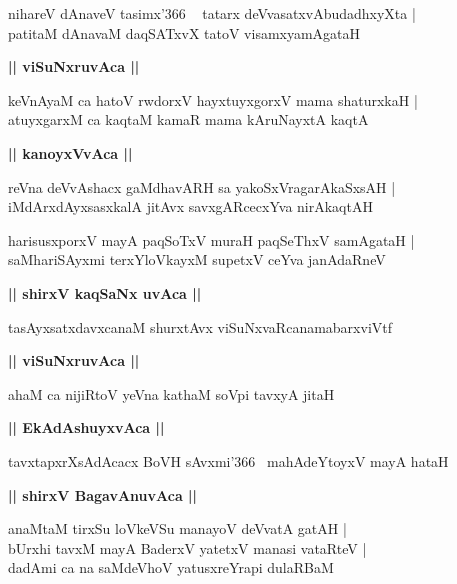 \documentclass[twoside,12pt,openright]{book}
\newcounter{shloka}[chapter]
\def\uvaca#1{\centerline{{\large\textbf{#1}}}}
\begin{document}
\begin{shloka}%
nihareV dAnaveV tasimx\char'366 ~ tatarx deVvasatxvAbudadhxyXta |\\
patitaM dAnavaM daqSATxvX tatoV visamxyamAgataH
\end{shloka}

\uvaca{|| viSuNxruvAca ||}

\begin{shloka}%
keVnAyaM ca hatoV rwdorxV hayxtuyxgorxV mama shaturxkaH |\\
atuyxgarxM ca kaqtaM kamaR mama kAruNayxtA kaqtA
\end{shloka}

\uvaca{|| kanoyxVvAca ||}

\begin{shloka}%
reVna deVvAshacx gaMdhavARH sa yakoSxVragarAkaSxsAH |\\
iMdArxdAyxsasxkalA jitAvx savxgARcecxYva nirAkaqtAH 
\end{shloka}

\begin{shloka}%
harisusxporxV mayA paqSoTxV muraH paqSeThxV samAgataH |\\
saMhariSAyxmi terxYloVkayxM supetxV ceYva janAdaRneV 
\end{shloka}

\uvaca{|| shirxV kaqSaNx uvAca ||}

\begin{shloka}%
tasAyxsatxdavxcanaM shurxtAvx viSuNxvaRcanamabarxviVtf
\end{shloka}

\uvaca{|| viSuNxruvAca ||}

\begin{shloka}%
ahaM ca nijiRtoV yeVna kathaM soVpi tavxyA jitaH 
\end{shloka}

\uvaca{|| EkAdAshuyxvAca ||}

\begin{shloka}%
tavxtapxrXsAdAcacx BoVH sAvxmi\char'366 ~mahAdeYtoyxV mayA hataH 
\end{shloka}

\uvaca{|| shirxV BagavAnuvAca ||}

\begin{shloka}%
anaMtaM tirxSu loVkeVSu manayoV deVvatA gatAH |\\
bUrxhi tavxM mayA BaderxV yatetxV manasi vataRteV |\\
dadAmi ca na saMdeVhoV yatusxreYrapi dulaRBaM 
\end{shloka}
\end{document}
